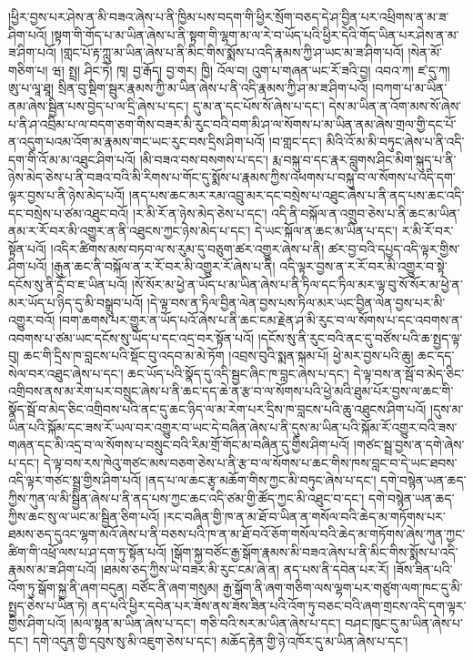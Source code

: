 །ཕྱིར་བྱས་པར་ཤེས་ན་མི་བཟའ་ཞེས་པ་ནི་ཁྱིམ་པས་བདག་གི་ཕྱིར་སྲོག་བཅད་དེ་ཤ་བྱིན་པར་འཕྲིགས་ན་མ་ཟ་ཤིག་པའོ། །སྟག་གི་གོད་པ་མ་ཡིན་ཞེས་པ་ནི་སྟག་གི་ལྷག་མ་ལ་རེ་བ་ཡོད་པའི་ཕྱིར་དེའི་གོད་ཡིན་པར་ཤེས་ན་མ་ཟ་ཤིག་པའོ། །གླང་པོ་རྟ་ཀླུ་མ་ཡིན་ཞེས་པ་ནི་མིང་གིས་སྨོས་པ་འདི་རྣམས་ཀྱི་ཤ་ཡང་མ་ཟ་ཤིག་པའོ། །སེན་མོ་གཅིག་པ། ཝ། སྤྲ། ཤིང་ཏེ། ཁྭ། བྱ་རྒོད། བྱ་གར། ཁྱི། འོལ་བ། འུག་པ་གཞན་ཡང་རོ་ཟའི་བྱ། འབའ་ཀ། ཛ་དུ་ཀ། ཨུ་པ་ལཱ་ཐཱ། སྲིན་བུ་སྡིག་སྦུར་རྣམས་ཀྱི་མ་ཡིན་ཞེས་པ་ནི་འདི་རྣམས་ཀྱི་ཤ་མ་ཟ་ཤིག་པའོ། །བཀག་པ་མ་ཡིན་ནམ་ཞེས་སྦྱིན་པས་བྱེད་པ་ལ་དྲི་ཞེས་པ་དང་། དུ་མ་ན་དང་པོས་སོ་ཞེས་པ་དང་། དེས་མ་ཡིན་ན་འོག་མས་སོ་ཞེས་པ་ནི་ཤ་འབྲིམ་པ་ལ་བདག་ཅག་གིས་བཟར་མི་རུང་བའི་བག་མི་ཤ་ལ་སོགས་པ་མ་ཡིན་ནམ་ཞེས་གྲལ་གྱི་དང་པོ་ན་འདུག་པའམ་འོག་མ་རྣམས་གང་ཡང་རུང་བས་དྲིས་ཤིག་པའོ། །བ་གླང་དང་། མིའི་འོ་མ་མི་བཏུང་ཞེས་པ་ནི་འདི་དག་གི་འོ་མ་མ་འཐུང་ཤིག་པའོ། །མི་བཟའ་བས་བསགས་པ་དང་། རྨ་བསྐུ་བ་དང་རྣར་བླུགས་ཤིང་མིག་སྐུད་པ་ནི་ཉེས་མེད་ཅེས་པ་ནི་བཟའ་བའི་མི་རིགས་པ་གོང་དུ་སྨོས་པ་རྣམས་ཀྱིས་འཕགས་པ་བསྐུ་བ་ལ་སོགས་པ་འདི་དག་ལྟར་བྱས་པ་ནི་ཉེས་མེད་པའོ། །ནད་པས་ཆང་མར་རམ་འབྲུ་མར་དང་བསྲེས་པ་འཐུང་ཞེས་པ་ནི་ནད་པས་ཆང་འདི་དང་བསྲེས་པ་ཙམ་འཐུང་བའོ། །ར་མི་རོ་ན་ཉེས་མེད་ཅེས་པ་དང་། འདི་ནི་བསྐོལ་ན་འགྲུབ་ཅེས་པ་ནི་ཆང་མ་ཡིན་ནམ་ར་རོ་བར་མི་འགྱུར་ན་ནི་འཐུངས་ཀྱང་ཉེས་མེད་པ་དང་། དེ་ཡང་སྐོལ་ན་ཆང་མ་ཡིན་པ་དང་། ར་མི་རོ་བར་སྟོན་པའོ། །འདིར་ཚིགས་མས་བཏབ་ལ་ས་རུམ་དུ་བཅུག་ཚར་འགྱུར་ཞེས་པ་ནི། ཚར་བྱ་བའི་དཔྱད་འདི་ལྟར་གྱིས་ཤིག་པའོ། །རྒུན་ཆང་ནི་བསྐོལ་ན་ར་རོ་བར་མི་འགྱུར་རོ་ཞེས་པ་ནི། འདི་ལྟར་བྱས་ན་ར་རོ་བར་མི་འགྱུར་བ་སྟེ་དངོས་སུ་ནི་དྲོ་བ་ཇ་ཡིན་པའོ། །སོ་སོར་མ་ཕྱེ་ན་ཡོད་པ་མ་ཡིན་ཞེས་པ་ནི་ཏིལ་དང་ཏིལ་མར་ལྟ་བུ་སོ་སོར་མ་ཕྱེ་ན་མར་ཡོད་པ་ཉིད་དུ་མི་བསྒྲུབ་པའོ། །དེ་ལྟ་བས་ན་ཏིལ་བྱིན་ལེན་བྱས་པས་ཏིལ་མར་ཡང་བྱིན་ལེན་བྱས་པར་མི་འགྱུར་བའོ། །བག་ཆགས་པར་གྱུར་ན་ཡོད་པའོ་ཞེས་པ་ནི་ཆང་ངམ་རྗེན་ཤ་མི་རུང་བ་ལ་སོགས་པ་དང་འབགས་ན་འབགས་པ་ཙམ་ཡང་དངོས་སུ་ཡོད་པ་དང་འདྲ་བར་སྟོན་པའོ། །དངོས་སུ་ནི་རུང་བའི་ནང་དུ་བཙོས་པའི་ཆ་སྤྱད་ལྟ་བུ། ཆང་གི་དྲིས་ཁ་བླངས་པའི་སྡོང་བུ་འདབ་མ་མེ་ཏོག །འབྲས་བུའི་སྨན་སྐམ་པོ། ཕྱེ་མར་བྱས་པའི་ཆུ། ཆང་དད་སེལ་བར་འཐུང་ཞེས་པ་དང་། ཆང་ཡོད་པའི་སྣོད་དུ་འདི་སྦྱང་ཞིང་ཁ་བླང་ཞེས་པ་དང་། དེ་ལྟ་བས་ན་སྦོ་བ་མེད་ཅིང་འགྲིབས་ནས་མ་རེག་པར་བསྲུང་ཞེས་པ་ནི་ཆང་དད་ཆེ་ན་རྩ་བ་ལ་སོགས་པའི་ཕྱེ་མའི་ཐུམ་པོར་བྱས་ལ་ཆང་གི་སྣོད་སྦོ་བ་མེད་ཅིང་འགྲིབས་པའི་ནང་དུ་ཆང་ཉིད་ལ་མ་རེག་པར་དྲིས་ཁ་བླངས་པའི་ཆུ་འཐུངས་ཤིག་པའོ། །དུས་མ་ཡིན་པའི་སྐོམ་དང་ཟས་རོ་ཡལ་བར་འགྱུར་བ་ཡང་དེ་བཞིན་ཞེས་པ་ནི་དུས་མ་ཡིན་པའི་སྐོམ་རོ་འགྱུར་བའི་ཟས་གཞན་དང་མི་འདྲ་བ་ལ་སོགས་པ་བསྲུང་བའི་རིམ་གྲོ་གོང་མ་བཞིན་དུ་གྱིས་ཤིག་པའོ། །གཙང་སྦྲ་བྱས་ན་དགེ་ཞེས་པ་དང་། དེ་ལྟ་བས་རས་ཁེའུ་གཙང་མས་བཅག་ཅེས་པ་ནི་རྩ་བ་ལ་སོགས་པ་ཆང་གིས་ཁས་བླང་བ་དེ་ཡང་ཐབས་འདི་ལྟར་གཙང་སྦྲ་གྱིས་ཤིག་པའོ། །ནད་པ་ལ་ཆང་རྩྭ་མཆོག་གིས་ཀྱང་མི་བཏུང་ཞེས་པ་དང་། དགེ་བསྙེན་ཡན་ཆད་ཀྱིས་ཀུན་ལ་མི་སྦྱིན་ཞེས་པ་ནི་ནད་པས་ཀྱང་ཆང་འདི་ཙམ་གྱི་ཚོད་ཀྱང་མི་འཐུང་བ་དང་། དགེ་བསྙེན་ཡན་ཆད་ཀྱིས་ཆང་སུ་ལ་ཡང་མ་སྦྱིན་ཅིག་པའོ། །རང་བཞིན་གྱི་ཁ་ན་མ་ཐོ་བ་ཡིན་ན་གསོལ་བའི་ཆེད་མ་གཏོགས་པར་ཐམས་ཅད་དུའང་ལྷག་མའོ་ཞེས་པ་ནི་བཅས་པའི་ཁ་ན་མ་ཐོ་བའོ་ཅོག་གསོལ་བའི་ཆེད་མ་གཏོགས་ཞེས་ཀུན་ཀྱང་ཚིག་གི་འཕྲོ་ལས་པ་ཤ་དག་ཏུ་སྟོན་པའོ། །སྒོག་སྐྱ་བཙོང་རྒྱ་སྒོག་རྣམས་མི་བཟའ་ཞེས་པ་ནི་མིང་གིས་སྨོས་པ་འདི་རྣམས་མ་ཟ་ཤིག་པའོ། །ཐམས་ཅད་ཀྱིས་ཡེ་བཟར་མི་རུང་ངམ་ཞེ་ན། ནད་པས་ནི་དབེན་པར་རོ། །ཟོས་ཟིན་པའི་འོག་ཏུ་སྒོག་སྐྱ་ནི་ཞག་བདུན། བཙོང་ནི་ཞག་གསུམ། རྒྱ་སྒོག་ནི་ཞག་གཅིག་ལས་ལྷག་པར་གཙུག་ལག་ཁང་དུ་མི་སྤྱད་ཅེས་པ་ཡིན་ཏེ། ནད་པའི་ཕྱིར་དབེན་པར་ཟོས་ནས་ཟོས་ཟིན་པའི་འོག་ཏུ་བཅང་བའི་ཞག་གྲངས་འདི་དག་ལྟར་གྱིས་ཤིག་པའོ། །མལ་སྟན་མ་ཡིན་ཞེས་པ་དང་། གཅི་བའི་སར་མ་ཡིན་ཞེས་པ་དང་། བཤང་ཁུང་དུ་མ་ཡིན་ཞེས་པ་དང་། དགེ་འདུན་གྱི་དབུས་སུ་མི་འཇུག་ཅེས་པ་དང་། མཆོད་རྟེན་གྱི་ཉེ་འཁོར་དུ་མ་ཡིན་ཞེས་པ་དང་། 